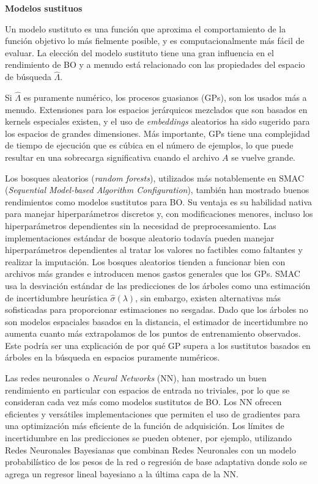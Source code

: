 \quad

\textbf{Modelos sustituos}

\quad

Un modelo sustituto es una función que aproxima el comportamiento de la función objetivo lo más fielmente posible, y es computacionalmente más fácil de evaluar. La elección del modelo sustituto tiene una gran influencia en el rendimiento de BO y a menudo está relacionado con las propiedades del espacio de búsqueda $\hat{\varLambda}$. 

Si $\hat{\varLambda}$ es puramente numérico, los procesos guasianos (GPs), son los usados más a menudo. Extensiones para los espacios jerárquicos mezclados que son basados en kernels especiales existen, y el uso de \emph{embeddings} aleatorios ha sido sugerido para los espacios de grandes dimensiones. Más importante, GPs tiene una complejidad de tiempo de ejecución que es cúbica en el número de ejemplos, lo que puede resultar en una sobrecarga significativa cuando el archivo $A$ se vuelve grande.

Los bosques aleatorios (\emph{random forests}), utilizados más notablemente en SMAC (\emph{Sequential Model-based Algorithm Configuration}), también han mostrado buenos rendimientos como modelos sustitutos para BO. Su ventaja es su habilidad nativa para manejar hiperparámetros discretos y, con modificaciones menores, incluso los hiperparámetros dependientes sin la necesidad de preprocesamiento. Las implementaciones estándar de bosque aleatorio todavía pueden manejar hiperparámetros dependientes al tratar los valores no factibles como faltantes y realizar la imputación. Los bosques aleatorios tienden a funcionar bien con archivos más grandes e introducen menos gastos generales que los GPs. SMAC usa la desviación estándar de las predicciones de los árboles como una estimación de incertidumbre heurística $\hat{\sigma}(\lambda)$,  sin embargo, existen alternativas más sofisticadas para proporcionar estimaciones no sesgadas. Dado que los árboles no son modelos espaciales basados en la distancia, el estimador de incertidumbre no aumenta cuanto más extrapolamos de los puntos de entrenamiento observados. Este podría ser una explicación de por qué GP supera a los sustitutos basados en árboles en la búsqueda en espacios puramente numéricos.

Las redes neuronales o \emph{Neural Networks} (NN), han mostrado un buen rendimiento en particular con espacios de entrada no triviales, por lo que se consideran cada vez más como modelos sustitutos de BO. Los NN ofrecen eficientes y versátiles implementaciones que permiten el uso de gradientes para una optimización más eficiente de la función de adquisición. Los límites de incertidumbre en las predicciones se pueden obtener, por ejemplo, utilizando Redes Neuronales Bayesianas que combinan Redes Neuronales con un modelo probabilístico de los pesos de la red o regresión de base adaptativa donde solo se agrega un regresor lineal bayesiano a la última capa de la NN.

